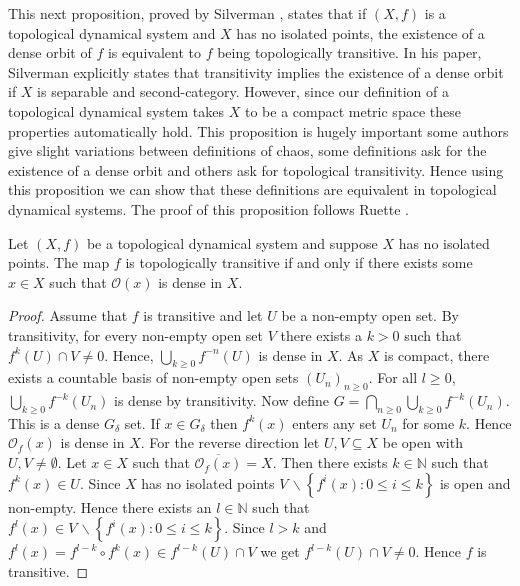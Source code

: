 This next proposition, proved by Silverman \cite{silverman}, states that if $(X, f)$ is a topological dynamical system and $X$ has no isolated points, the existence of a dense orbit of $f$ is equivalent to $f$ being topologically transitive. In his paper, Silverman explicitly states that transitivity implies the existence of a dense orbit if $X$ is separable and second-category. However, since our definition of a topological dynamical system takes $X$ to be a compact metric space these properties automatically hold. This proposition is hugely important some authors give slight variations between definitions of chaos, some definitions ask for the existence of a dense orbit and others ask for topological transitivity. Hence using this proposition we can show that these definitions are equivalent in topological dynamical systems. The proof of this proposition follows Ruette \cite[\S 2.1]{ruette}.

\begin{prop} \label{prop:dense-transitive}
    Let $(X, f)$ be a topological dynamical system and suppose $X$ has no isolated points. The map $f$ is topologically transitive if and only if there exists some $x \in X$ such that $\mathcal{O}(x)$ is dense in $X$.
    \begin{proof}
        Assume that $f$ is transitive and let $U$ be a non-empty open set. By transitivity, for every non-empty open set $V$ there exists a $k > 0$ such that $f^k(U) \cap V \neq 0$. Hence, $\bigcup_{k \geq 0}f^{-n}(U)$ is dense in $X$. As $X$ is compact, there exists a countable basis of non-empty open sets $(U_n)_{n \geq 0}$. For all $l \geq 0$, $\bigcup_{k \geq 0}f^{-k}(U_n)$ is dense by transitivity. Now define $G = \bigcap_{n \geq 0}\bigcup_{k \geq 0}f^{-k}(U_n)$. This is a dense $G_\delta$ set. If $x \in G_\delta$ then $f^k(x)$ enters any set $U_n$ for some $k$. Hence $\mathcal{O}_f(x)$ is dense in $X$. For the reverse direction let $U, V \subseteq X$ be open with $U, V \neq \emptyset$. Let $x \in X$ such that $\overline{\mathcal{O}_f(x)} = X$. Then there exists $k \in \mathbb{N}$ such that $f^k(x) \in U$. Since $X$ has no isolated points $V\, \backslash \left\lbrace f^i(x) : 0 \leq i \leq k \right\rbrace$ is open and non-empty. Hence there exists an $l \in \mathbb{N}$ such that $f^l(x) \in V\, \backslash \left\lbrace f^i(x) : 0 \leq i \leq k \right\rbrace$. Since $l > k$ and $f^l(x) = f^{l - k} \circ f^{k}(x) \in f^{l - k}(U) \cap V$ we get $f^{l - k}(U) \cap V \neq 0$. Hence $f$ is transitive.
    \end{proof}
\end{prop}

